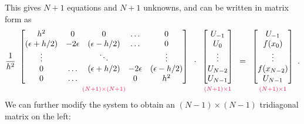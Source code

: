 This gives $N+1$ equations and $N+1$ unknowns, and can be written in matrix form as
\[ \frac{1}{h^2}
\begin{array}{c}
\begin{bmatrix}h^2 & 0 &0&\hdots &0 \\ (\epsilon + h/2) &-2\epsilon & (\epsilon - h/2) &\hdots &0\\ \vdots &  & \ddots & &\vdots \\
0 & \hdots & (\epsilon + h/2) &-2\epsilon & (\epsilon - h/2) \\ 0 & \hdots & & 0 & h^2
\end{bmatrix}\\
{\scriptstyle\textcolor{red}{(N+1)\times(N+1)}}
\end{array}\cdot
\begin{array}{c}
\begin{bmatrix}U_{-1}\\U_0\\ \vdots \\U_{N-2} \\U_{N-1}\end{bmatrix}\\
{\scriptstyle\textcolor{red}{(N+1)\times1}}
\end{array}=
\begin{array}{c}
\begin{bmatrix}U_{-1}\\f(x_0)\\ \vdots \\ f(x_{N-2}) \\ U_{N-1} \end{bmatrix}\\
{\scriptstyle\textcolor{red}{(N+1)\times1}}
\end{array}.
\]
We can further modify the system to obtain an $(N-1)\times (N-1)$ tridiagonal matrix on the left:
